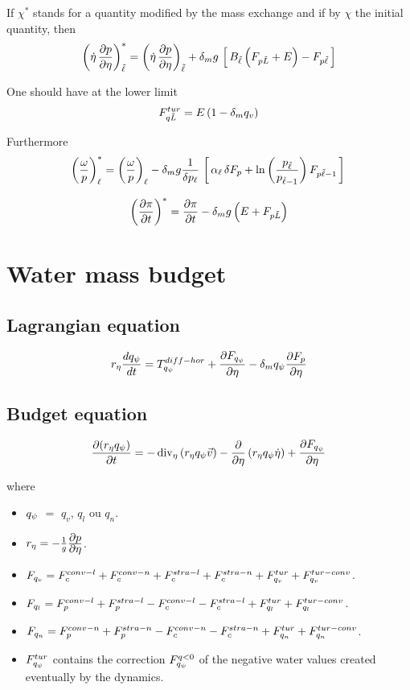 If $\chi^*$ stands for a quantity modified by the mass exchange and if by $\chi$ the initial quantity, then
$$ \left( \dot\eta\,\frac{\displaystyle \partial p}{\displaystyle \partial \eta} \right)_{\tilde\ell}^* = \left( \dot\eta\,\frac{\displaystyle \partial p}{\displaystyle \partial \eta} \right)_{\tilde\ell} + \delta_m 
g \, \left[ \, B_{\tilde \ell} \left( F_{p\tilde L} + E \right) - F_{p\tilde\ell} \, \right] $$

One should have at the lower limit
$$ F_{q\tilde L}^{tur} = E \left( 1-\delta_m q_v \right) $$

Furthermore
$$ \left( \frac{\omega}p \right)_{\ell}^* = \left( \frac{\omega}p \right)_{\ell} - \delta_m g \frac 1{\delta p_\ell} 
\, \left[ \, \alpha_{\ell} \,\delta F_{p} + \ln \left( \frac{p_{\tilde\ell}}{p_{\tilde\ell-1}} \right) F_{p\tilde\ell-1} 
\, \right] \, $$

$$ \left( \frac{\displaystyle \partial \pi}{\displaystyle \partial t} \right)^* = \frac{\displaystyle \partial \pi}{\displaystyle \partial t} - \delta_m g \left( E + F_{p\tilde L} \right) $$

\section{Water mass budget}
\subsection*{Lagrangian equation}

$$
r_{\eta} \frac{d q_\psi}{dt}=
T_{q_\psi}^{diff-hor}
+ \frac{\displaystyle \partial F_{q_\psi}}{\displaystyle \partial \eta}
- \delta_m q_\psi \frac{\displaystyle \partial F_{p}}{\displaystyle \partial \eta}
$$

\subsection*{Budget equation}

$$
\frac{\displaystyle \partial (r_{\eta} q_\psi)}{\displaystyle \partial t}=
- \mathop{\rm div}\nolimits_{\eta}\left(r_{\eta} q_\psi \vec{v}\right)
- \frac{\displaystyle \partial }{\displaystyle \partial \eta}\left(r_{\eta} q_\psi \dot{\eta}\right)
+ \frac{\displaystyle \partial F_{q_\psi}}{\displaystyle \partial \eta}
$$

\noi where
\begin{itemize}
        \item $q_\psi$ $=$ $q_v$, $q_l$ ou $q_n$.
        \item $r_{\eta}=-\frac{1}{g}\frac{\displaystyle \partial p}{\displaystyle \partial \eta}$.
        \item $F_{q_v}=F_{c}^{conv-l}+F_{c}^{conv-n}+F_{c}^{stra-l}+F_{c}^{stra-n}+F_{q_v}^{tur}+F_{q_v}^{tur-conv}$.
        \item $F_{q_l}=F_{p}^{conv-l}+F_{p}^{stra-l}-F_{c}^{conv-l}-F_{c}^{stra-l}+F_{q_l}^{tur}+F_{q_l}^{tur-conv}$.
        \item $F_{q_n}=F_{p}^{conv-n}+F_{p}^{stra-n}-F_{c}^{conv-n}-F_{c}^{stra-n}+F_{q_n}^{tur}+F_{q_n}^{tur-conv}$.
        \item $F_{q_\psi}^{tur}$ contains the correction $F_{q_\psi}^{q<0}$ of the negative water values created eventually by the dynamics.
\end{itemize}

